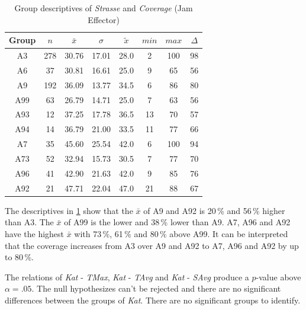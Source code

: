\begin{table}[ht]
	\tiny
	\centering
	\begin{tabular}{c|c|c|c|c|c|c|c}
		\toprule
		Group & $n$ & $\bar{x}$ & $\sigma$ & $\tilde{x}$ & $min$ & $max$ & $\Delta$ \\
		\midrule
		A3   & 278 & 30.76 & 17.01 & 28.0 & 2  & 100 & 98 \\ 
		A6   & 37  & 30.81 & 16.61 & 25.0 & 9  & 65  & 56 \\ 
		A9   & 192 & 36.09 & 13.77 & 34.5 & 6  & 86  & 80 \\ 
		A99  & 63  & 26.79 & 14.71 & 25.0 & 7  & 63  & 56 \\ 
		A93  & 12  & 37.25 & 17.78 & 36.5 & 13 & 70  & 57 \\ 
		A94  & 14  & 36.79 & 21.00 & 33.5 & 11 & 77  & 66 \\ 
		A7   & 35  & 45.60 & 25.54 & 42.0 & 6  & 100 & 94 \\ 
		A73  & 52  & 32.94 & 15.73 & 30.5 & 7  & 77  & 70 \\ 
		A96  & 41  & 42.90 & 21.63 & 42.0 & 9  & 85  & 76 \\ 
		A92  & 21  & 47.71 & 22.04 & 47.0 & 21 & 88  & 67 \\ 
		\bottomrule
	  \end{tabular}
    \caption{Group descriptives of \textit{Strasse} and \textit{Coverage} (Jam Effector)}
    \label{tbl:descriptives_baysis_effector_Strasse_Cov}
\end{table}
The descriptives in \cref{tbl:descriptives_baysis_effector_Strasse_Cov} show that the $\bar{x}$ of A9 and A92 is 20\,\% and 56\,\% higher than A3. The $\bar{x}$ of A99 is the lower and 38\,\% lower than A9. A7, A96 and A92 have the highest $\bar{x}$ with 73\,\%, 61\,\% and 80\,\% above A99. It can be interpreted that the coverage increases from A3 over A9 and A92 to A7, A96 and A92 by up to 80\,\%.

The relations of \textit{Kat} - \textit{TMax}, \textit{Kat} - \textit{TAvg} and \textit{Kat} - \textit{SAvg} produce a $p$-value above $\alpha=.05$. The null hypothesizes can't be rejected and there are no significant differences between the groups of \textit{Kat}. There are no significant groups to identify.

